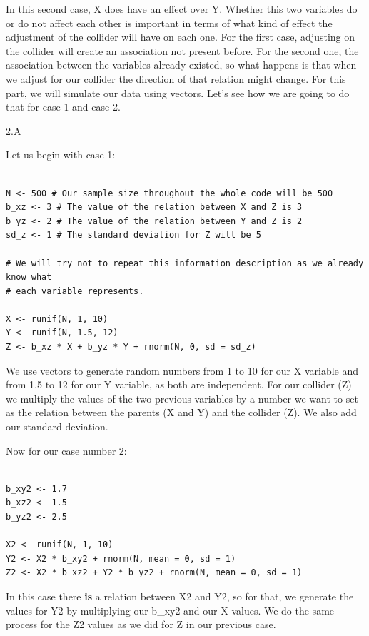 \documentclass{article}
\begin{document}
In this second case, X does have an effect over Y. Whether this two variables do or do not affect each other is important in terms of what kind of effect the adjustment of the collider will have on each one. For the first case, adjusting on the collider will create an association not present before. For the second one, the association between the variables already existed, so what happens is that when we adjust for our collider the direction of that relation might change. 
For this part, we will simulate our data using vectors. Let's see how we are going to do that for case 1 and case 2.


\bigskip
2.A
\smallskip


Let us begin with case 1:

\begin{lstlisting}

N <- 500 # Our sample size throughout the whole code will be 500
b_xz <- 3 # The value of the relation between X and Z is 3
b_yz <- 2 # The value of the relation between Y and Z is 2
sd_z <- 1 # The standard deviation for Z will be 5

# We will try not to repeat this information description as we already know what
# each variable represents.

X <- runif(N, 1, 10)
Y <- runif(N, 1.5, 12)
Z <- b_xz * X + b_yz * Y + rnorm(N, 0, sd = sd_z)

\end{lstlisting}

We use vectors to generate random numbers from 1 to 10 for our X variable and from 1.5 to 12 for our Y variable, as both are independent. For our collider (Z) we multiply the values of the two previous variables by a number we want to set as the relation between the parents (X and Y) and the collider (Z). We also add our standard deviation.

Now for our case number 2:

\begin{lstlisting}

b_xy2 <- 1.7 
b_xz2 <- 1.5
b_yz2 <- 2.5

X2 <- runif(N, 1, 10)
Y2 <- X2 * b_xy2 + rnorm(N, mean = 0, sd = 1)
Z2 <- X2 * b_xz2 + Y2 * b_yz2 + rnorm(N, mean = 0, sd = 1)

\end{lstlisting}

In this case there \textbf{is} a relation between X2 and Y2, so for that, we  generate the values for Y2 by multiplying our b\_xy2 and our X values. We  do the same process for the Z2 values as we did for Z in our previous case.
\end{document}
